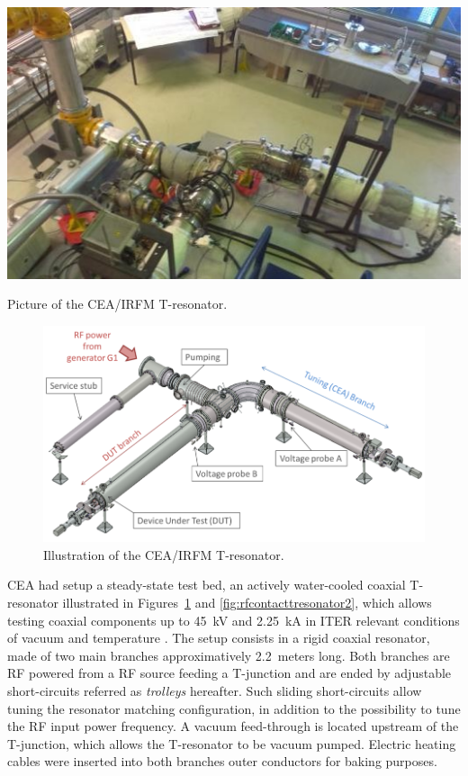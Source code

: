 {\begin{marginfigure}
	\centering
	\includegraphics[width=1.0\linewidth]{figures/chap3/RF_contacts/RF_contact_Tresonator2}
	\caption{Picture of the CEA/IRFM T-resonator.}
	\label{fig:rfcontacttresonator2}
\end{marginfigure}

\begin{figure}[h]
	\centering
	\includegraphics[width=1.0\linewidth]{figures/chap3/RF_contacts/RF_contact_Tresonator_illustration2}
	\caption{Illustration of the CEA/IRFM T-resonator.}
	\label{fig:rfcontacttresonatorillustration2}
\end{figure}

CEA had setup a steady-state test bed, an actively water-cooled coaxial T-resonator illustrated in Figures~\ref{fig:rfcontacttresonatorillustration2} and \ref{fig:rfcontacttresonator2}, which allows testing coaxial components up to 45~kV and 2.25~kA in ITER relevant conditions of vacuum and temperature . The setup consists in a rigid coaxial resonator, made of two main branches approximatively 2.2~meters long. Both branches are RF powered from a RF source feeding a T-junction and are ended by adjustable short-circuits referred as \textit{trolleys} hereafter. Such sliding short-circuits allow tuning the resonator matching configuration, in addition to the possibility to tune the RF input power frequency. A vacuum feed-through is located upstream of the T-junction, which allows the T-resonator to be vacuum pumped. Electric heating cables were inserted into both branches outer conductors for baking purposes. 

}
